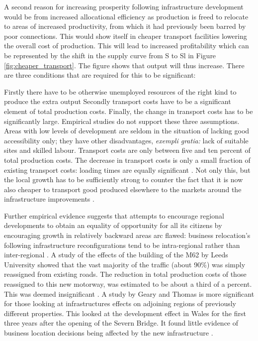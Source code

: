 

A second reason for increasing prosperity following infrastructure development would be from increased allocational efficiency as production is freed to relocate to areas of increased productivity, from which it had previously been barred by poor connections. This would show itself in cheaper transport facilities lowering the overall cost of production. This will lead to increased profitability which can be represented by the shift in the supply curve from S to Sl in Figure \ref{fig:cheaper_transport}. The figure shows that output will thus increase. There are three conditions that are required for this to be significant:

Firstly there have to be otherwise unemployed resources of the right kind to produce the extra output Secondly transport costs have to be a significant element of total production costs. Finally, the change in transport costs has to be significantly large. Empirical studies do not support these three assumptions. Areas with low levels of development are seldom in the situation of lacking good accessibility only; they have other disadvantages, \textit{exempli gratia:} lack of suitable sites and skilled labour. Transport costs are only between five and ten percent of total production costs. The decrease in transport costs is only a small fraction of existing transport costs: loading times are equally significant \citep{Parkinson:1981}. Not only this, but the local growth has to be sufficiently strong to counter the fact that it is now also cheaper to transport good produced elsewhere to the markets around the infrastructure improvements \citep{Chisholm:1973}.

Further empirical evidence suggests that attempts to encourage regional developments to obtain an equality of opportunity for all its citizens by encouraging growth in relatively backward areas arc flawed: business relocation's following infrastructure reconfigurations tend to be intra-regional rather than inter-regional \citep{Parkinson:1981}. A study of the effects of the building of the M62 by Leeds University showed that the vast majority of the traffic (about 90\%) was simply reassigned from existing roads. The reduction in total production costs of those reassigned to this new motorway, was estimated to be about a third of a percent. This was deemed insignificant \citep{Gwilliam:1978}. A study by Geary and Thomas is more significant for those looking at infrastructures effects on adjoining regions of previously different properties. This looked at the development effect in Wales for the first three years after the opening of the Severn Bridge. It found little evidence of business location decisions being affected by the new infrastructure \citep{Geary:1973}.

